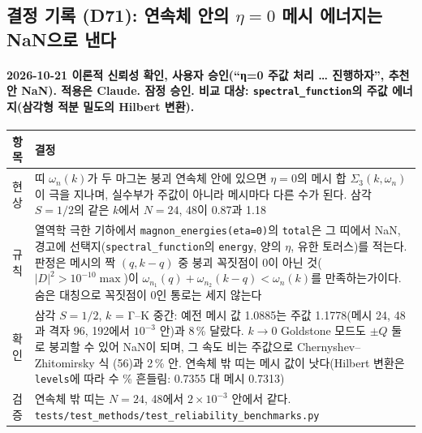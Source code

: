 \subsection{결정 기록 (D71): 연속체 안의 $\eta=0$ 메시 에너지는 NaN으로 낸다}\label{decisions-d71-eta-zero-continuum}
\begingroup%
  \framesubtitle{2026-10-21 이론적 신뢰성 확인, 사용자 승인(``η=0 주값 처리 … 진행하자'', 추천안 NaN). 적용은 Claude. 잠정 승인. 비교 대상: \texttt{spectral\_function}의 주값 에너지(삼각형 적분 밀도의 Hilbert 변환).}
  \small\renewcommand{\arraystretch}{1.12}
  \begin{tabularx}{\textwidth}{@{}P{3.0cm}Y@{}}
    \toprule
    항목 & 결정 \\
    \midrule
    현상 & 띠 $\omega_n(k)$가 두 마그논 붕괴 연속체 안에 있으면 $\eta=0$의 메시 합 $\Sigma_3(k,\omega_n)$이 극을 지나며, 실수부가 주값이 아니라 메시마다 다른 수가 된다. 삼각 $S=1/2$의 같은 $k$에서 $N=24$, 48이 0.87과 1.18 \\
    규칙 & 열역학 극한 기하에서 \texttt{magnon\_energies(eta=0)}의 \texttt{total}은 그 띠에서 NaN, 경고에 선택지(\texttt{spectral\_function}의 \texttt{energy}, 양의 $\eta$, 유한 토러스)를 적는다. 판정은 메시의 짝 $(q,k-q)$ 중 붕괴 꼭짓점이 0이 아닌 것($|D|^2>10^{-10}\max$)이 $\omega_{n_1}(q)+\omega_{n_2}(k-q)<\omega_n(k)$를 만족하는가이다. 숨은 대칭으로 꼭짓점이 0인 통로는 세지 않는다 \\
    확인 & 삼각 $S=1/2$, $k$ = Γ–K 중간: 예전 메시 값 1.0885는 주값 1.1778(메시 24, 48과 격자 96, 192에서 $10^{-3}$ 안)과 8\,\% 달랐다. $k\to0$ Goldstone 모드도 $\pm Q$ 둘로 붕괴할 수 있어 NaN이 되며, 그 속도 비는 주값으로 Chernyshev--Zhitomirsky 식 (56)과 2\,\% 안. 연속체 밖 띠는 메시 값이 낫다(Hilbert 변환은 \texttt{levels}에 따라 수 \% 흔들림: 0.7355 대 메시 0.7313) \\
    검증 & 연속체 밖 띠는 $N=24$, 48에서 $2\times10^{-3}$ 안에서 같다. \texttt{tests/test\_methods/test\_reliability\_benchmarks.py} \\
    \bottomrule
  \end{tabularx}
\endgroup


